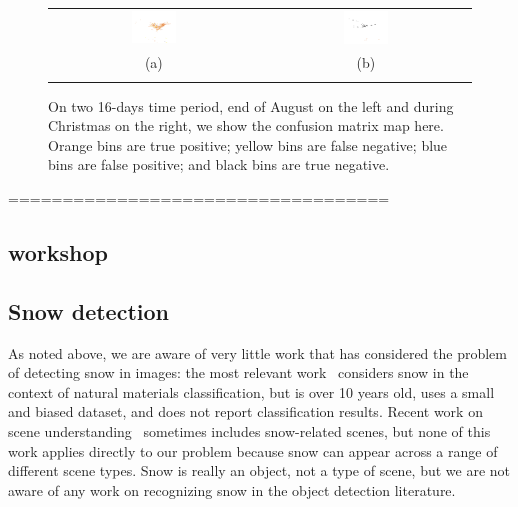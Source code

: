 \begin{figure}
\begin{center}
\begin{tabular}{c c}
\includegraphics[width=0.22\textwidth]{imggrid/13.png} &
\includegraphics[width=0.22\textwidth]{imggrid/22.png} \\
(a) & (b)\\
\\
\end{tabular}
\end{center}
\vspace{-24pt}
\caption{On two 16-days time period, end of August on the left and during Christmas on the right, we show the confusion matrix map here. Orange bins are true positive; yellow bins are false negative; blue bins are false positive; and black bins are true negative.}
\label{fig:map}
\vspace{-12pt}
\end{figure}

\hfill \break
\hfill \break
===================================
\hfill \break
\hfill \break
\subsection*{workshop}
\subsection{Snow detection}


As noted above, we are aware of very little work that has considered
the problem of detecting snow in images: the most relevant
work~\cite{singhal2003spatialcontext} considers snow in the context of
natural materials classification, but is over 10 years old, uses a
small and biased dataset, and does not report classification results.
Recent work on scene understanding~\cite{XiaoHEOT10} sometimes
includes snow-related scenes, but none of this work applies directly
to our problem because snow can appear across a range of different
scene types. Snow is really an object, not a type of scene, but we are
not aware of any work on recognizing snow in the object detection
literature.

